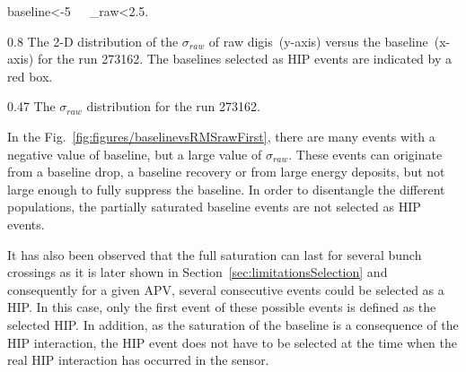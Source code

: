 {
baseline<-5~~~\sigma_{raw}<2.5.
}


                 {0.8}       %
                 {The 2-D distribution of the $\sigma_{raw}$ of raw digis~(y-axis) versus the baseline~(x-axis) for the run 273162. The baselines selected as HIP events are indicated by a red box. } %




                 {0.47}       %
                 {The $\sigma_{raw}$ distribution for the run 273162. }

In the Fig.~\ref{fig:figures/baselinevsRMSrawFirst}, there are many events with a negative value of baseline, but a large value of $\sigma_{raw}$. These events can originate from a baseline drop, a baseline recovery or from large energy deposits, but not large enough to fully suppress the baseline. In order to  disentangle the different populations, the partially saturated baseline events are not selected as HIP events. 

It has also been observed that the full saturation can last for several bunch crossings as it is later shown in Section~\ref{sec:limitationsSelection} and consequently for a given APV, several consecutive events could be selected as a HIP. In this case, only the first event of these possible events is defined as the selected HIP. In addition, as the saturation of the baseline is a consequence of the HIP interaction, the HIP event does not have to be selected at the time when the real HIP interaction has occurred in the sensor. 


